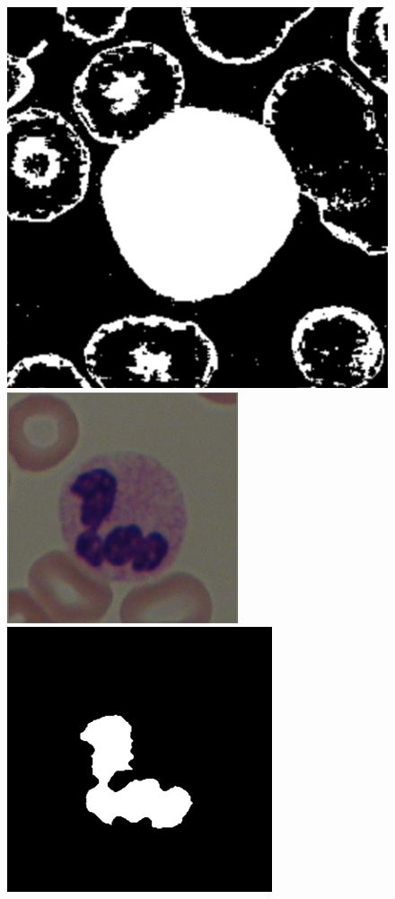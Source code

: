 \documentclass[final,a4paper,12pt,english]{UnicaPhdThesis3}
\begin{document}
\begin{figure}[!b]
	\includegraphics[height=0.10\textheight, width=0.10\textheight]{images/2015_1_caip/1-3}\vspace{1mm}
	\includegraphics[height=0.10\textheight, width=0.10\textheight]{images/2015_1_caip/2-1}
	\includegraphics[height=0.10\textheight, width=0.10\textheight]{images/2015_1_caip/2-3}

\end{figure}
\end{document}
